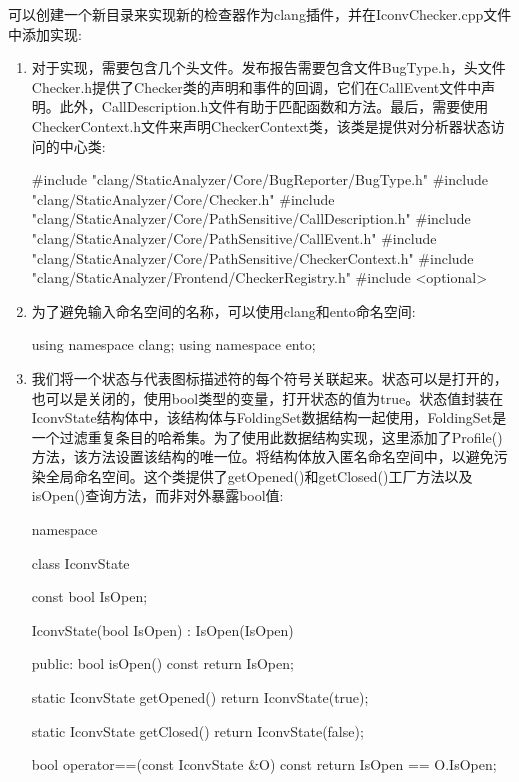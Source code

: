可以创建一个新目录来实现新的检查器作为clang插件，并在IconvChecker.cpp文件中添加实现:

\begin{enumerate}
\item
对于实现，需要包含几个头文件。发布报告需要包含文件BugType.h，头文件Checker.h提供了Checker类的声明和事件的回调，它们在CallEvent文件中声明。此外，CallDescription.h文件有助于匹配函数和方法。最后，需要使用CheckerContext.h文件来声明CheckerContext类，该类是提供对分析器状态访问的中心类:

\begin{cpp}
#include "clang/StaticAnalyzer/Core/BugReporter/BugType.h"
#include "clang/StaticAnalyzer/Core/Checker.h"
#include "clang/StaticAnalyzer/Core/PathSensitive/CallDescription.h"
#include "clang/StaticAnalyzer/Core/PathSensitive/CallEvent.h"
#include "clang/StaticAnalyzer/Core/PathSensitive/CheckerContext.h"
#include "clang/StaticAnalyzer/Frontend/CheckerRegistry.h"
#include <optional>
\end{cpp}

\item
为了避免输入命名空间的名称，可以使用clang和ento命名空间:

\begin{cpp}
using namespace clang;
using namespace ento;
\end{cpp}

\item
我们将一个状态与代表图标描述符的每个符号关联起来。状态可以是打开的，也可以是关闭的，使用bool类型的变量，打开状态的值为true。状态值封装在IconvState结构体中，该结构体与FoldingSet数据结构一起使用，FoldingSet是一个过滤重复条目的哈希集。为了使用此数据结构实现，这里添加了Profile()方法，该方法设置该结构的唯一位。将结构体放入匿名命名空间中，以避免污染全局命名空间。这个类提供了getOpened()和getClosed()工厂方法以及isOpen()查询方法，而非对外暴露bool值:

\begin{cpp}
namespace {
class IconvState {
    const bool IsOpen;

    IconvState(bool IsOpen) : IsOpen(IsOpen) {}

public:
    bool isOpen() const { return IsOpen; }

    static IconvState getOpened() {
        return IconvState(true);
    }

    static IconvState getClosed() {
        return IconvState(false);
    }

    bool operator==(const IconvState &O) const {
        return IsOpen == O.IsOpen;
    }

}}
\end{cpp}
\end{enumerate}
